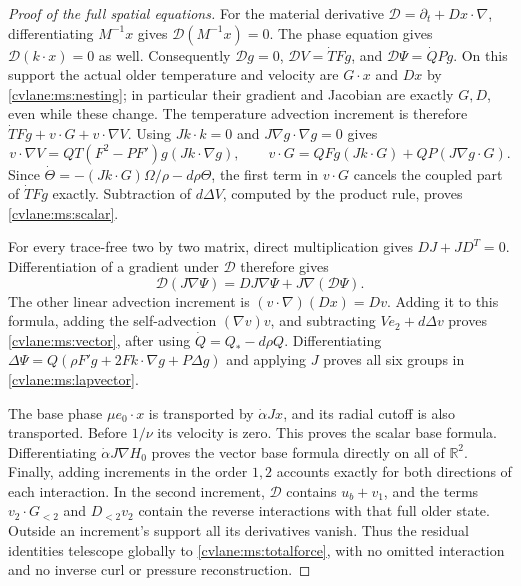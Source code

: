 \begin{proof}[Proof of the full spatial equations]
For the material derivative $\mathcal D=\partial_t+Dx\cdot\nabla$,
differentiating $M^{-1}x$ gives $\mathcal D(M^{-1}x)=0$.
The phase equation gives $\mathcal D(k\cdot x)=0$ as well.
Consequently $\mathcal Dg=0$, $\mathcal DV=\dot T Fg$,
and $\mathcal D\Psi=\dot QPg$.
On this support the actual older temperature and velocity are
$G\cdot x$ and $Dx$ by \eqref{cvlane:ms:nesting}; in particular their
gradient and Jacobian are exactly $G,D$, even while these change.
The temperature advection increment is therefore
$\dot T Fg+v\cdot G+v\cdot\nabla V$.
Using $Jk\cdot k=0$ and $J\nabla g\cdot\nabla g=0$ gives
\[
 v\cdot\nabla V=QT(F^2-PF')g(Jk\cdot\nabla g),\qquad
 v\cdot G=QFg(Jk\cdot G)+QP(J\nabla g\cdot G).
\]
Since $\dot\Theta=-(Jk\cdot G)\Omega/\rho-d\rho\Theta$,
the first term in $v\cdot G$ cancels the coupled part of
$\dot T Fg$ exactly. Subtraction of $d\Delta V$, computed
by the product rule, proves \eqref{cvlane:ms:scalar}.

For every trace-free two by two matrix, direct multiplication
gives $DJ+JD^T=0$. Differentiation of a gradient under $\mathcal D$
therefore gives
\[
 \mathcal D(J\nabla\Psi)=D J\nabla\Psi+
                                  J\nabla(\mathcal D\Psi).
\]
The other linear advection increment is
$(v\cdot\nabla)(Dx)=Dv$. Adding it to this formula, adding the
self-advection $(\nabla v)v$, and subtracting $Ve_2+d\Delta v$
proves \eqref{cvlane:ms:vector}, after using $\dot Q=Q_*-d\rho Q$.
Differentiating $\Delta\Psi=Q(\rho F'g+2Fk\cdot\nabla g+P\Delta g)$
and applying $J$ proves all six groups in \eqref{cvlane:ms:lapvector}.

The base phase $\mu e_0\cdot x$ is transported by
$\dot\alpha Jx$, and its radial cutoff is also transported.
Before $1/\nu$ its velocity is zero. This proves the scalar
base formula. Differentiating $\dot\alpha J\nabla H_0$ proves
the vector base formula directly on all of $\mathbb R^2$.
Finally, adding increments in the order $1,2$ accounts exactly
for both directions of each interaction. In the second increment,
$\mathcal D$ contains $u_b+v_1$, and the terms $v_2\cdot G_{<2}$
and $D_{<2}v_2$ contain the reverse interactions with that full
older state. Outside an increment's support all its derivatives
vanish. Thus the residual identities telescope globally to
\eqref{cvlane:ms:totalforce}, with no omitted interaction and no inverse
curl or pressure reconstruction.
\end{proof}

